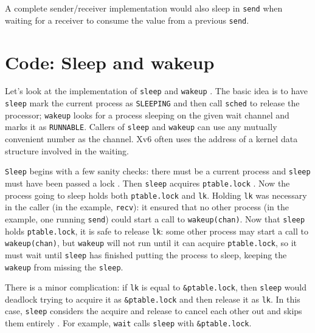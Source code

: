 A complete sender/receiver implementation would also sleep
in
\lstinline{send}
when waiting for a receiver to consume
the value from a previous
\lstinline{send}.
\section{Code: Sleep and wakeup}

Let's look at the implementation of
\lstinline{sleep}
and
\lstinline{wakeup}
.
The basic idea is to have
\lstinline{sleep}
mark the current process as
\lstinline{SLEEPING}
and then call
\lstinline{sched}
to release the processor;
\lstinline{wakeup}
looks for a process sleeping on the given wait channel
and marks it as 
\lstinline{RUNNABLE}.
Callers of
\lstinline{sleep}
and
\lstinline{wakeup}
can use any mutually convenient number as the channel.
Xv6 often uses the address
of a kernel data structure involved in the waiting.

\lstinline{Sleep}
begins with a few sanity checks:
there must be a current process
and
\lstinline{sleep}
must have been passed a lock
.
Then 
\lstinline{sleep}
acquires 
\lstinline{ptable.lock}
.
Now the process going to sleep holds both
\lstinline{ptable.lock}
and
\lstinline{lk}.
Holding
\lstinline{lk}
was necessary in the caller (in the example,
\lstinline{recv}):
it
ensured that no other process (in the example,
one running
\lstinline{send})
could start a call to
\lstinline{wakeup(chan)}.
Now that
\lstinline{sleep}
holds
\lstinline{ptable.lock},
it is safe to release
\lstinline{lk}:
some other process may start a call to
\lstinline{wakeup(chan)},
but
\lstinline{wakeup}
will not run until it can acquire
\lstinline{ptable.lock},
so it must wait until
\lstinline{sleep}
has finished putting the process to sleep,
keeping the
\lstinline{wakeup}
from missing the
\lstinline{sleep}.

There is a minor complication: if 
\lstinline{lk}
is equal to
\lstinline{&ptable.lock},
then
\lstinline{sleep}
would deadlock trying to acquire it as
\lstinline{&ptable.lock}
and then release it as
\lstinline{lk}.
In this case,
\lstinline{sleep}
considers the acquire and release
to cancel each other out
and skips them entirely
.
For example,
\lstinline{wait}
calls
\lstinline{sleep}
with 
\lstinline{&ptable.lock}.

